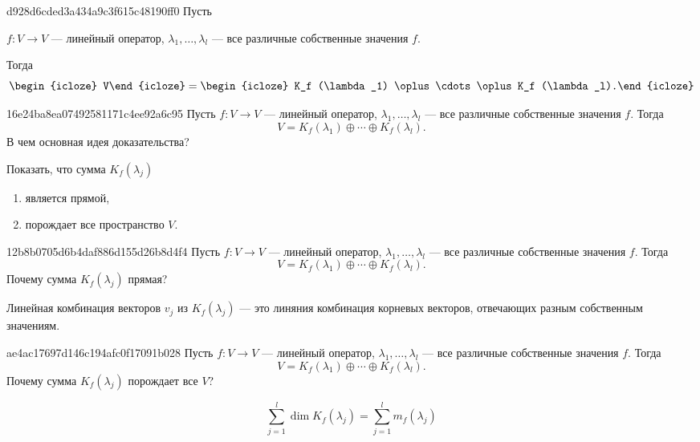 \begin{note}{d928d6cded3a434a9c3f615c48190ff0}
    Пусть \begin{icloze}{3}\( f : V \to V \) --- линейный оператор, \( \lambda_1, \ldots, \lambda_l \) --- все различные собственные значения \( f \).\end{icloze}
    Тогда
    \[
        \begin{icloze}{2}V\end{icloze} = \begin{icloze}{1}K_f (\lambda_1) \oplus \cdots \oplus K_f (\lambda_l).\end{icloze}
    \]
\end{note}

\begin{note}{16e24ba8ea07492581171c4ee92a6c95}
    Пусть \( f : V \to V \) --- линейный оператор, \( \lambda_1, \ldots, \lambda_l \) --- все различные собственные значения \( f \).
    Тогда
    \[
        V = K_f (\lambda_1) \oplus \cdots \oplus K_f (\lambda_l).
    \]
    В чем основная идея доказательства?

    \begin{cloze}{1}
        Показать, что сумма \( K_f(\lambda_j) \)
        \begin{enumerate}
            \item является прямой,
            \item порождает все пространство \( V \).
        \end{enumerate}
    \end{cloze}
\end{note}

\begin{note}{12b8b0705d6b4daf886d155d26b8d4f4}
    Пусть \( f : V \to V \) --- линейный оператор, \( \lambda_1, \ldots, \lambda_l \) --- все различные собственные значения \( f \).
    Тогда
    \[
        V = K_f (\lambda_1) \oplus \cdots \oplus K_f (\lambda_l).
    \]
    Почему сумма \( K_f(\lambda_j) \) прямая?

    \begin{cloze}{1}
        Линейная комбинация векторов \( v_j \) из \( K_f (\lambda_j) \) --- это линяния комбинация корневых векторов, отвечающих разным собственным значениям.
    \end{cloze}
\end{note}

\begin{note}{ae4ac17697d146c194afc0f17091b028}
    Пусть \( f : V \to V \) --- линейный оператор, \( \lambda_1, \ldots, \lambda_l \) --- все различные собственные значения \( f \).
    Тогда
    \[
        V = K_f (\lambda_1) \oplus \cdots \oplus K_f (\lambda_l).
    \]
    Почему сумма \( K_f(\lambda_j) \) порождает все \( V \)?

    \begin{cloze}{1}
        \[
            \sum_{j=1}^{l} \dim K_f(\lambda_j) = \sum_{j=1}^{l} m_f(\lambda_j)
        \]
    \end{cloze}
\end{note}

